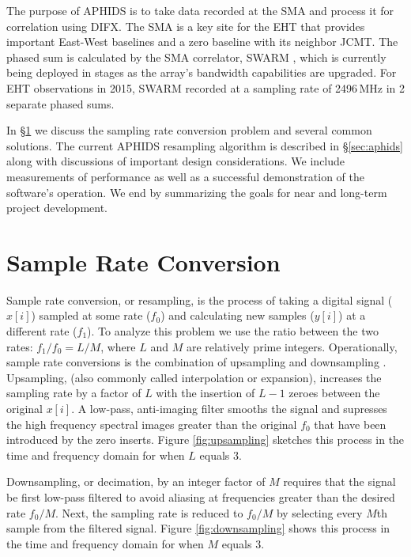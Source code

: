 \documentclass[11pt,preprint]{aastex}
\begin{document}
The purpose of APHIDS is to take data recorded at the SMA and process it for correlation using
DIFX.  The SMA is a key site for the EHT that provides important East-West baselines and a zero baseline with 
its neighbor JCMT.  The phased sum is calculated by the SMA correlator, SWARM 
\citep[\textbf{S}MA \textbf{W}ideband \textbf{A}stronomical \textbf{R}OACH2 \textbf{M}achine][]{weintroub14}, 
which is currently being deployed in stages as the array's bandwidth capabilities are 
upgraded.  For EHT observations in 2015, SWARM recorded at a sampling rate of 2496\,MHz in 2 separate phased
sums.

In \S\ref{sec:src_basics} we discuss the sampling rate conversion problem and several common solutions.
The current APHIDS resampling algorithm is described in \S\ref{sec:aphids} along with discussions of important
design considerations.  We include measurements of performance as well as a successful
demonstration of the software's operation.  We end by summarizing the goals for near and long-term project 
development.



\section{Sample Rate Conversion} \label{sec:src_basics}

Sample rate conversion, or resampling, is the process of taking a digital signal ($x[i]$) sampled at some rate 
($f_0$) and calculating new samples ($y[i]$) at a different rate ($f_1$).  To analyze this problem we use the 
ratio between the two rates: $f_1/f_0 = L/M$, where $L$ and $M$ are relatively prime integers.  Operationally, 
sample rate conversions is the combination of upsampling and downsampling \citep{oppenheim10,lyons11}.  
Upsampling, (also commonly called interpolation or expansion), increases the sampling rate 
by a factor of $L$ with the insertion of $L-1$ zeroes between the original $x[i]$.  A low-pass, 
anti-imaging filter smooths the signal and supresses the high frequency spectral images greater than the original 
$f_0$ that have been introduced by the zero inserts.  Figure \ref{fig:upsampling} sketches this process in the 
time and frequency domain for when $L$ equals 3. 



Downsampling, or decimation, by an integer factor of $M$ requires that the signal be first low-pass filtered to 
avoid aliasing at frequencies greater than the desired rate $f_0/M$.  Next, the sampling rate is reduced to 
$f_0/M$ by selecting every $M$th sample from the filtered signal.  Figure \ref{fig:downsampling} shows this 
process in the time and frequency domain for when $M$ equals 3.
\end{document}
